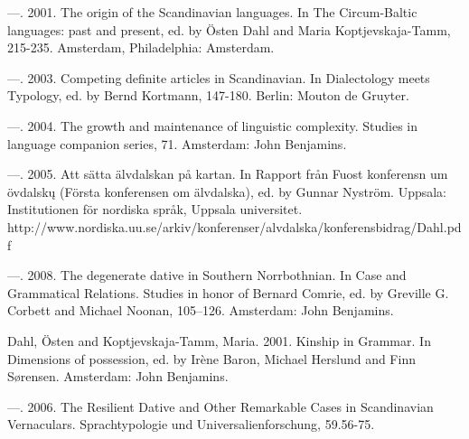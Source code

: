 \begin{styleBodytextC}
—. 2001. The origin of the Scandinavian languages. In The Circum-Baltic languages: past and present, ed. by Östen Dahl and Maria Koptjevskaja-Tamm, 215-235. Amsterdam, Philadelphia: Amsterdam.

\end{styleBodytextC}

\begin{styleBodytextC}
—. 2003. Competing definite articles in Scandinavian. In Dialectology meets Typology, ed. by Bernd Kortmann, 147-180. Berlin: Mouton de Gruyter.

\end{styleBodytextC}

\begin{styleBodytextC}
—. 2004. The growth and maintenance of linguistic complexity. Studies in language companion series, 71. Amsterdam: John Benjamins.

\end{styleBodytextC}

\begin{styleBodytextC}
—. 2005. Att sätta älvdalskan på kartan. In Rapport från Fuost konferensn um övdalsk\k{u} (Första konferensen om älvdalska), ed. by Gunnar Nyström. Uppsala: Institutionen för nordiska språk, Uppsala universitet. http://www.nordiska.uu.se/arkiv/konferenser/alvdalska/konferensbidrag/Dahl.pdf 

\end{styleBodytextC}

\begin{styleBodytextC}
—. 2008. The degenerate dative in Southern Norrbothnian. In Case and Grammatical Relations. Studies in honor of Bernard Comrie, ed. by Greville G. Corbett and Michael Noonan, 105–126. Amsterdam: John Benjamins.

\end{styleBodytextC}

\begin{styleBodytextC}
Dahl, Östen and Koptjevskaja-Tamm, Maria. 2001. Kinship in Grammar. In Dimensions of possession, ed. by Irène Baron, Michael Herslund and Finn Sørensen. Amsterdam: John Benjamins.

\end{styleBodytextC}

\begin{styleBodytextC}
—. 2006. The Resilient Dative and Other Remarkable Cases in Scandinavian Vernaculars. Sprachtypologie und Universalienforschung, 59.56-75.

\end{styleBodytextC}

